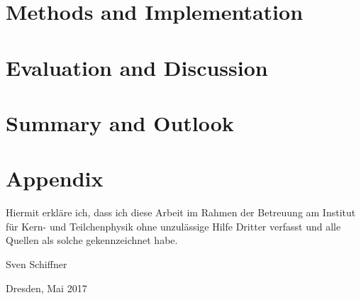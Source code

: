 \chapter{Methods and Implementation}

\chapter{Evaluation and Discussion}


\chapter{Summary and Outlook}


\printbibliography

\appendix

\chapter{Appendix}


\clearpage
\thispagestyle{empty}
\vspace*{1.5em}

Hiermit erkläre ich, dass ich diese Arbeit im Rahmen der Betreuung am Institut
für Kern- und Teilchenphysik ohne unzulässige Hilfe Dritter verfasst und alle Quellen als solche gekennzeichnet habe.

\vspace*{45em}

Sven Schiffner \par
Dresden, Mai 2017


